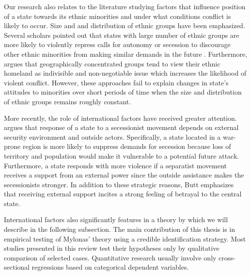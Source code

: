 Our research also relates to the literature studying factors that influence position of a state towards its ethnic minorities and under what conditions conflict is likely to occur. Size and and distribution of ethnic groups have been emphasized. Several scholars pointed out that
states with large number of ethnic groups are more likely to violently repress calls for autonomy or secession to discourage other ethnic minorities from making similar demands in the future \citep{evera_hypotheses_1994, toft_geography_2005,walter_reputation_2009}. 
Furthermore,  \citet{toft_geography_2005} argues that geographically concentrated groups tend to view their ethnic homeland as indivisible and non-negotiable issue which increases the likelihood of violent conflict. However, these approaches fail to explain changes in state's attitudes to minorities over short periods of time when the size and distribution of ethnic groups remains roughly constant. 

More recently, the role of international factors have received greater attention.  \citet{butt_secession_2017}  argues that response of a state to a secessionist movement depends on external security environment and outside actors. Specifically, a state located in a war-prone region is more likely to suppress demands for secession because loss of territory and population would make it vulnerable  to a potential future attack. Furthermore, a state responds with more violence if a separatist movement receives a support from an external power since the outside assistance makes the secessionists stronger. In addition to these strategic reasons, Butt emphasizes that  receiving external support incites  a strong feeling of betrayal to the central state.   

International factors also significantly features  in a theory by  \citet{mylonas_politics_2013} which we will describe in the following subsection.  The main contribution of this thesis is in empirical testing of  Mylonas' theory   using a credible identification strategy. Most studies presented in this review test their hypotheses only by qualitative comparison of selected cases. Quantitative research usually involve only cross-sectional regressions based on categorical dependent variables.    

